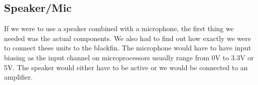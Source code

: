 \subsection{Speaker/Mic}
If we were to use a speaker combined with a microphone, the first thing we needed was the actual components. We also had to find out how exactly we were to connect these units to the blackfin. The microphone would have to have input biasing as the input channel on microprocessors usually range from 0V to 3.3V or 5V. The speaker would either have to be active or we would be connected to an amplifier. 
